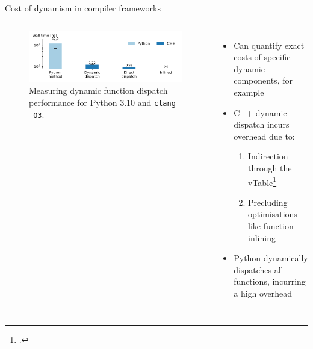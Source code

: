 \documentclass[10pt,aspectratio=169]{beamer}
\renewcommand{\cite}{\footcite}
\begin{document}
\begin{frame}{Cost of dynamism in compiler frameworks}
    \begin{columns}[T,onlytextwidth]
            \vspace{2em}
            \begin{figure}[H]
                \includegraphics[width=\textwidth]{images/dispatch.pdf}
                \caption{Measuring dynamic function dispatch performance for Python 3.10 and \texttt{clang -O3}.}
                \label{fig:dispatch}
            \end{figure}
            \begin{itemize}
                \item Can quantify exact costs of specific dynamic components, for example
                \vspace{1em}
                \item C++ dynamic dispatch incurs overhead due to:
                \begin{enumerate}
                    \item Indirection through the vTable\cite{driesenDirectCostVirtual1996}
                    \item Precluding optimisations like function inlining
                \end{enumerate}
                \item Python dynamically dispatches all functions, incurring a high overhead
            \end{itemize}
    \end{columns}
\end{frame}
\end{document}
